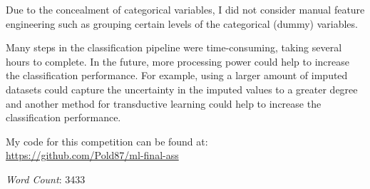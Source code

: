 \documentclass[a4paper,11pt]{article}
\begin{document}
Due to the concealment of categorical variables, I did not consider
manual feature engineering such as grouping certain levels of the
categorical (dummy) variables.

Many steps in the classification pipeline were time-consuming, taking
several hours to complete. In the future, more processing power could
help to increase the classification performance. For example, using a
larger amount of imputed datasets could capture the uncertainty in the
imputed values to a greater degree and another method for
transductive learning could help to increase the classification performance.

My code for this competition can be found at:\\
\url{https://github.com/Pold87/ml-final-ass}

\emph{Word Count}: 3433
\clearpage
\printbibliography
\end{document}
